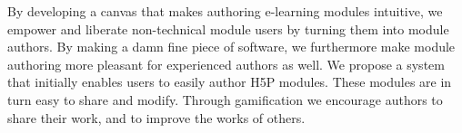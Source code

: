By developing a canvas that makes authoring e-learning modules intuitive, we 
empower and liberate non-technical module users by turning them into module 
authors. By making a damn fine piece of software, we furthermore make module 
authoring more pleasant for experienced authors as well. We propose a system 
that initially enables users to easily author H5P modules. These modules are 
in turn easy to share and modify. Through gamification we encourage authors to 
share their work, and to improve the works of others.
